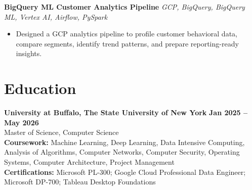 \documentclass[letterpaper,11pt]{article}
\begin{document}
\textbf{BigQuery ML Customer Analytics Pipeline} \hfill \textit{GCP, BigQuery, BigQuery ML, Vertex AI, Airflow, PySpark}\\[-1pt]
\begin{itemize}
    \item Designed a GCP analytics pipeline to profile customer behavioral data, compare segments, identify trend patterns, and prepare reporting-ready insights.
\end{itemize}

\section*{Education}

\textbf{University at Buffalo, The State University of New York} \hfill \textbf{Jan 2025 -- May 2026}\\[-1pt]
Master of Science, Computer Science\\[-1pt]
\textbf{Coursework:} Machine Learning, Deep Learning, Data Intensive Computing, Analysis of Algorithms, Computer Networks, Computer Security, Operating Systems, Computer Architecture, Project Management\\[10pt]

\textbf{Certifications:} Microsoft PL-300; Google Cloud Professional Data Engineer; Microsoft DP-700; Tableau Desktop Foundations
\end{document}
